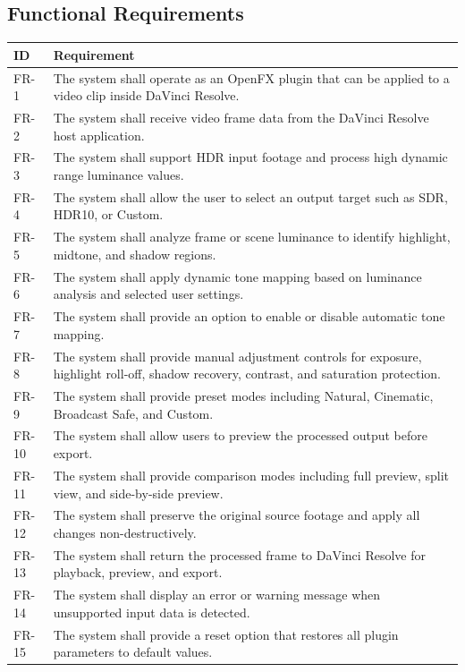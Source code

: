 \documentclass[12pt]{article}
\begin{document}
\subsection{Functional Requirements}

\begin{longtable}{|p{2.2cm}|p{12.5cm}|}
\hline
\textbf{ID} & \textbf{Requirement} \\
\hline
FR-1 & The system shall operate as an OpenFX plugin that can be applied to a video clip inside DaVinci Resolve. \\
\hline
FR-2 & The system shall receive video frame data from the DaVinci Resolve host application. \\
\hline
FR-3 & The system shall support HDR input footage and process high dynamic range luminance values. \\
\hline
FR-4 & The system shall allow the user to select an output target such as SDR, HDR10, or Custom. \\
\hline
FR-5 & The system shall analyze frame or scene luminance to identify highlight, midtone, and shadow regions. \\
\hline
FR-6 & The system shall apply dynamic tone mapping based on luminance analysis and selected user settings. \\
\hline
FR-7 & The system shall provide an option to enable or disable automatic tone mapping. \\
\hline
FR-8 & The system shall provide manual adjustment controls for exposure, highlight roll-off, shadow recovery, contrast, and saturation protection. \\
\hline
FR-9 & The system shall provide preset modes including Natural, Cinematic, Broadcast Safe, and Custom. \\
\hline
FR-10 & The system shall allow users to preview the processed output before export. \\
\hline
FR-11 & The system shall provide comparison modes including full preview, split view, and side-by-side preview. \\
\hline
FR-12 & The system shall preserve the original source footage and apply all changes non-destructively. \\
\hline
FR-13 & The system shall return the processed frame to DaVinci Resolve for playback, preview, and export. \\
\hline
FR-14 & The system shall display an error or warning message when unsupported input data is detected. \\
\hline
FR-15 & The system shall provide a reset option that restores all plugin parameters to default values. \\
\hline
\end{longtable}
\end{document}
